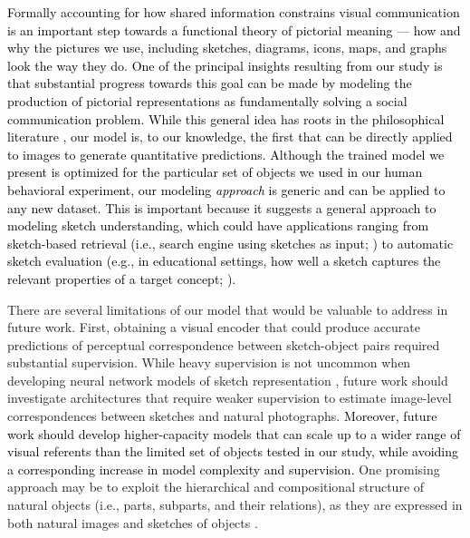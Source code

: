 \documentclass{svjour3}
\newcommand{\revised}[1]{\textcolor{Black}{#1}}
\begin{document}
\revised{Formally accounting for how shared information constrains visual communication is an important step towards a functional theory of pictorial meaning --- how and why the pictures we use, including sketches, diagrams, icons, maps, and graphs look the way they do. One of the principal insights resulting from our study is that substantial progress towards this goal can be made by modeling the production of pictorial representations as fundamentally solving a social communication problem. While this general idea has roots in the philosophical literature \citep*{goodman1976languages,abell2009canny}, our model is, to our knowledge, the first that can be directly applied to images to generate quantitative predictions. Although the trained model we present is optimized for the particular set of objects we used in our human behavioral experiment, our modeling \textit{approach} is generic and can be applied to any new dataset. This is important because it suggests a general approach to modeling sketch understanding, which could have applications ranging from sketch-based retrieval (i.e., search engine using sketches as input; \citet*{sangkloy2016sketchy}) to automatic sketch evaluation (e.g., in educational settings, how well a sketch captures the relevant properties of a target concept; \citet*{forbus2008cogsketch}).}




There are several limitations of our model that would be valuable to address in future work. 
First, obtaining a visual encoder that could produce accurate predictions of perceptual correspondence between sketch-object pairs required substantial supervision. 
While heavy supervision is not uncommon when developing neural network models of sketch representation \citep*{sangkloy2016sketchy,yu2017sketch,song2017deep}, future work should investigate architectures that require weaker supervision to estimate image-level correspondences between sketches and natural photographs. 
\revised{Moreover, future work should develop higher-capacity models that can scale up to a wider range of visual referents than the limited set of objects tested in our study, while avoiding a corresponding increase in model complexity and supervision.}
One promising approach may be to exploit the hierarchical and compositional structure of natural objects (i.e., parts, subparts, and their relations), as they are expressed in both natural images and sketches of objects \citep*{mukherjee_cogsci_2019}.
\end{document}
